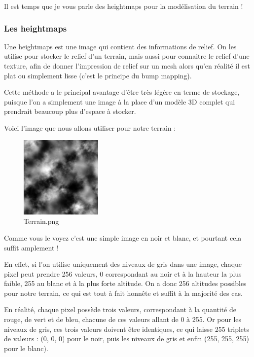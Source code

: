 Il est temps que je vous parle des heightmaps pour la modélisation du terrain !


\subsubsection{Les heightmaps}

Une heightmaps est une image qui contient des informations de relief. On les utilise pour stocker le relief d'un terrain, mais aussi pour connaitre le relief d'une texture, afin de donner l'impression de relief sur un mesh alors qu'en réalité il est plat ou simplement lisse (c'est le principe du bump mapping).

Cette méthode a le principal avantage d'être très légère en terme de stockage, puisque l'on a simplement une image à la place d'un modèle 3D complet qui prendrait beaucoup plus d'espace à stocker.

Voici l'image que nous allons utiliser pour notre terrain :
\begin{figure}[hbtp]
\caption{Terrain.png}
\centering
\includegraphics[width=4cm]{Ogre/1_Base_de_Ogre/5_Garder_les_pieds_sur_terre/images/terrain.png} %
\end{figure}

Comme vous le voyez c'est une simple image en noir et blanc, et pourtant cela suffit amplement !

En effet, si l'on utilise uniquement des niveaux de gris dans une image, chaque pixel peut prendre 256 valeurs, 0 correspondant au noir et à la hauteur la plus faible, 255 au blanc et à la plus forte altitude. On a donc 256 altitudes possibles pour notre terrain, ce qui est tout à fait honnête et suffit à la majorité des cas.

En réalité, chaque pixel possède trois valeurs, correspondant à la quantité de rouge, de vert et de bleu, chacune de ces valeurs allant de 0 à 255. Or pour les niveaux de gris, ces trois valeurs doivent être identiques, ce qui laisse 255 triplets de valeurs : (0, 0, 0) pour le noir, puis les niveaux de gris et enfin (255, 255, 255) pour le blanc).

